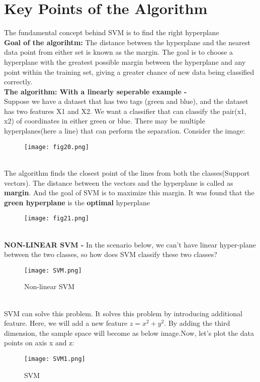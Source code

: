 \documentclass[a4paper, 11pt]{article}
\begin{document}
\section{Key Points of the Algorithm}
The fundamental concept behind SVM is to find the right hyperplane\\
\textbf{Goal of the algorihtm: } The distance between the hyperplane and the nearest data point from either set is known as the margin. The goal is to choose a hyperplane with the greatest possible margin between the hyperplane and any point within the training set, giving a greater chance of new data being classified correctly.\\
\textbf{The algorithm: With a linearly seperable example -}\\
Suppose we have a dataset that has two tags (green and blue), and the dataset has two features X1 and X2. We want a classifier that can classify the pair(x1, x2) of coordinates in either green or blue.
There may be multiple hyperplanes(here a line) that can perform the separation. Consider the image: 
\begin{figure}[ht!]
    \texttt{[image: fig20.png]}
    \label{fig:fig20}
  \end{figure}
  \\ The algorithm finds the closest point of the lines from both the classes(Support vectors).
  The distance between the vectors and the hyperplane is called as \textbf{margin}. And the goal of SVM is to maximize this margin. It was found that the \textbf{green hyperplane} is the \textbf{optimal} hyperplane
  \begin{figure}[ht!]
    \texttt{[image: fig21.png]}
    \label{fig:fig21}
  \end{figure}
\\ \textbf{NON-LINEAR SVM -}  In the scenario below, we can’t have linear hyper-plane between the two classes, so how does SVM classify these two classes? \\
\begin{figure}[h!]
\texttt{[image: SVM.png]}
\label{fig:fig22}
\caption{Non-linear SVM}
\end{figure} \\
SVM can solve this problem. It solves this problem by introducing additional feature. Here, we will add a new feature $z=x^2+y^2$. By adding the third dimension, the sample space will become as below image.Now, let’s plot the data points on axis x and z:
\begin{figure}[h!]
    \texttt{[image: SVM1.png]}
    \label{fig:fig23}
    \caption{SVM}
    \end{figure}
\end{document}
